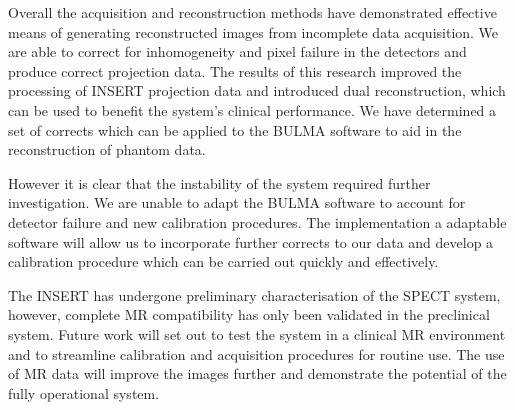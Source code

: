 Overall the acquisition and reconstruction methods have demonstrated effective means of generating reconstructed images from incomplete data acquisition. We are able to correct for inhomogeneity and pixel failure in the detectors and produce correct projection data. The results of this research improved the processing of \acrshort{INSERT} projection data and introduced dual reconstruction, which can be used to benefit the system's clinical performance. We have determined a set of corrects which can be applied to the BULMA software to aid in the reconstruction of phantom data. 

However it is clear that the instability of the system required further investigation. We are unable to adapt the BULMA software to account for detector failure and new calibration procedures. The implementation a adaptable software will allow us to incorporate further corrects to our data and develop a calibration procedure which can be carried out quickly and effectively. 

The \acrshort{INSERT} has undergone preliminary characterisation of the \acrshort{SPECT} system, however, complete \acrshort{MR} compatibility has only been validated in the preclinical system. Future work will set out to test the system in a clinical \acrshort{MR} environment and to streamline calibration and acquisition procedures for routine use. The use of \acrshort{MR} data will improve the images further and demonstrate the potential of the fully operational system.   

